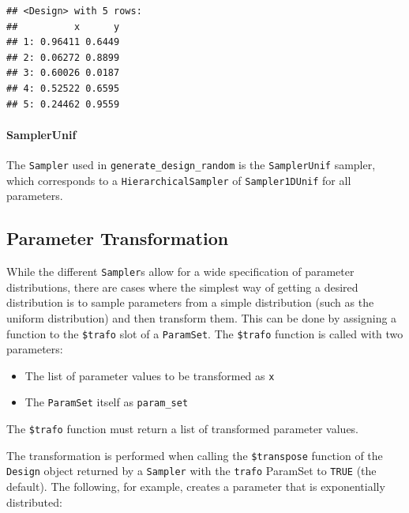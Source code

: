 \documentclass[
]{scrbook}
\providecommand{\tightlist}{%
  \setlength{\itemsep}{0pt}\setlength{\parskip}{0pt}}
\begin{document}
\begin{verbatim}
## <Design> with 5 rows:
##          x      y
## 1: 0.96411 0.6449
## 2: 0.06272 0.8899
## 3: 0.60026 0.0187
## 4: 0.52522 0.6595
## 5: 0.24462 0.9559
\end{verbatim}

\hypertarget{samplerunif}{%
\paragraph{SamplerUnif}\label{samplerunif}}

The \texttt{Sampler} used in \texttt{generate\_design\_random} is the \texttt{SamplerUnif} sampler, which corresponds to a \texttt{HierarchicalSampler} of \texttt{Sampler1DUnif} for all parameters.

\hypertarget{parameter-transformation}{%
\subsection{Parameter Transformation}\label{parameter-transformation}}

While the different \texttt{Sampler}s allow for a wide specification of parameter distributions, there are cases where the simplest way of getting a desired distribution is to sample parameters from a simple distribution (such as the uniform distribution) and then transform them.
This can be done by assigning a function to the \texttt{\$trafo} slot of a \texttt{ParamSet}.
The \texttt{\$trafo} function is called with two parameters:

\begin{itemize}
\tightlist
\item
  The list of parameter values to be transformed as \texttt{x}
\item
  The \texttt{ParamSet} itself as \texttt{param\_set}
\end{itemize}

The \texttt{\$trafo} function must return a list of transformed parameter values.

The transformation is performed when calling the \texttt{\$transpose} function of the \texttt{Design} object returned by a \texttt{Sampler} with the \texttt{trafo} ParamSet to \texttt{TRUE} (the default).
The following, for example, creates a parameter that is exponentially distributed:
\end{document}
